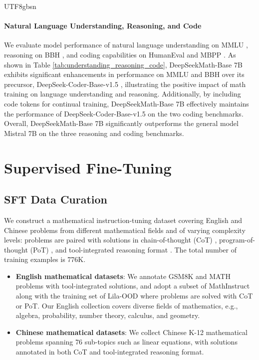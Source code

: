 \documentclass[11pt, a4paper, logo, copyright, nonumbering]{deepseek}
\newcommand{\spmath}{DeepSeekMath}
\begin{document}
\begin{CJK*}{UTF8}{gbsn}
\paragraph{Natural Language Understanding, Reasoning, and Code}

We evaluate model performance of natural language understanding on MMLU \citep{mmlu}, reasoning on BBH \citep{bbh}, and coding capabilities on HumanEval \citep{codex} and MBPP \citep{mbpp}. As shown in Table \ref{tab:understanding_reasoning_code}, \spmath-Base 7B exhibits significant enhancements in performance on MMLU and BBH over its precursor, DeepSeek-Coder-Base-v1.5 \citep{deepseek-coder}, illustrating the positive impact of math training on language understanding and reasoning.
Additionally, by including code tokens for continual training, \spmath-Base 7B effectively maintains the performance of DeepSeek-Coder-Base-v1.5 on the two coding benchmarks.
Overall, \spmath-Base 7B significantly outperforms the general model Mistral 7B \citep{mistral} on the three reasoning and coding benchmarks.

\section{Supervised Fine-Tuning}

\subsection{SFT Data Curation}

We construct a mathematical instruction-tuning dataset covering English and Chinese problems from different mathematical fields and of varying complexity levels:
problems are paired with solutions in chain-of-thought (CoT) \citep{cot}, program-of-thought (PoT) \citep{pot,pal}, and tool-integrated reasoning format \citep{tora}.
The total number of training examples is 776K.
\begin{itemize}[topsep=0pt]
    \item \textbf{English mathematical datasets}:
    We annotate GSM8K and MATH problems with tool-integrated solutions, and adopt a subset of MathInstruct \citep{MathInstruct} along with the training set of Lila-OOD \citep{lila} where problems are solved with CoT or PoT.
    Our English collection covers diverse fields of mathematics, e.g., algebra, probability, number theory, calculus, and geometry.
    \item \textbf{Chinese mathematical datasets}:
    We collect Chinese K-12 mathematical problems spanning 76 sub-topics such as linear equations, with solutions annotated in both CoT and tool-integrated reasoning format.
\end{itemize}


\end{CJK*}
\end{document}

